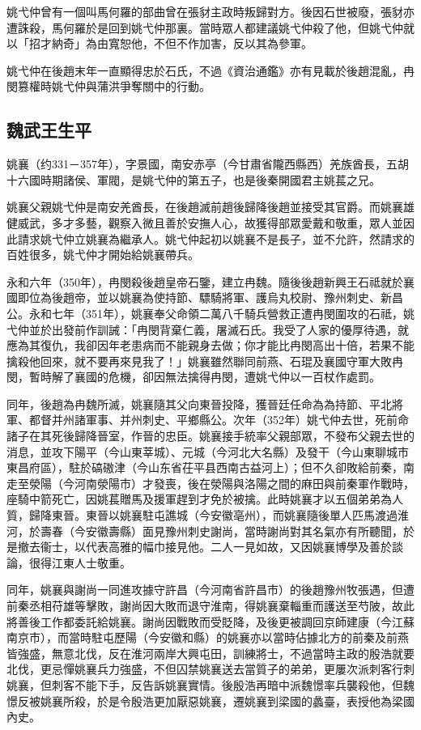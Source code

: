 姚弋仲曾有一個叫馬何羅的部曲曾在張豺主政時叛歸對方。後因石世被廢，張豺亦遭誅殺，馬何羅於是回到姚弋仲那裏。當時眾人都建議姚弋仲殺了他，但姚弋仲就以「招才納奇」為由寬恕他，不但不作加害，反以其為參軍。

姚弋仲在後趙末年一直顯得忠於石氏，不過《資治通鑑》亦有見載於後趙混亂，冉閔篡權時姚弋仲與蒲洪爭奪關中的行動。

\subsection{魏武王生平}

姚襄（约331－357年），字景國，南安赤亭（今甘肅省隴西縣西）羌族酋長，五胡十六國時期諸侯、軍閥，是姚弋仲的第五子，也是後秦開國君主姚萇之兄。

姚襄父親姚弋仲是南安羌酋長，在後趙滅前趙後歸降後趙並接受其官爵。而姚襄雄健威武，多才多藝，觀察入微且善於安撫人心，故獲得部眾愛戴和敬重，眾人並因此請求姚弋仲立姚襄為繼承人。姚弋仲起初以姚襄不是長子，並不允許，然請求的百姓很多，姚弋仲才開始給姚襄帶兵。

永和六年（350年），冉閔殺後趙皇帝石鑒，建立冉魏。隨後後趙新興王石祗就於襄國即位為後趙帝，並以姚襄為使持節、驃騎將軍、護烏丸校尉、豫州刺史、新昌公。永和七年（351年），姚襄奉父命領二萬八千騎兵營救正遭冉閔圍攻的石祗，姚弋仲並於出發前作訓誡：「冉閔背棄仁義，屠滅石氏。我受了人家的優厚待遇，就應為其復仇，我卻因年老患病而不能親身去做；你才能比冉閔高出十倍，若果不能擒殺他回來，就不要再來見我了！」姚襄雖然聯同前燕、石琨及襄國守軍大敗冉閔，暫時解了襄國的危機，卻因無法擒得冉閔，遭姚弋仲以一百杖作處罰。

同年，後趙為冉魏所滅，姚襄隨其父向東晉投降，獲晉廷任命為為持節、平北將軍、都督并州諸軍事、并州刺史、平鄉縣公。次年（352年）姚弋仲去世，死前命諸子在其死後歸降晉室，作晉的忠臣。姚襄接手統率父親部眾，不發布父親去世的消息，並攻下陽平（今山東莘城）、元城（今河北大名縣）及發干（今山東聊城市東昌府區），駐於碻磝津（今山东省茌平县西南古益河上）；但不久卻敗給前秦，南走至滎陽（今河南滎陽市）才發喪，後在滎陽與洛陽之間的麻田與前秦軍作戰時，座騎中箭死亡，因姚萇贈馬及援軍趕到才免於被擒。此時姚襄才以五個弟弟為人質，歸降東晉。東晉以姚襄駐屯譙城（今安徽亳州），而姚襄隨後單人匹馬渡過淮河，於壽春（今安徽壽縣）面見豫州刺史謝尚，當時謝尚對其名氣亦有所聽聞，於是撤去衞士，以代表高雅的幅巾接見他。二人一見如故，又因姚襄博學及善於談論，很得江東人士敬重。

同年，姚襄與謝尚一同進攻據守許昌（今河南省許昌市）的後趙豫州牧張遇，但遭前秦丞相苻雄等擊敗，謝尚因大敗而退守淮南，得姚襄棄輜重而護送至芍陂，故此將善後工作都委託給姚襄。謝尚因戰敗而受貶降，及後更被調回京師建康（今江蘇南京市），而當時駐屯歷陽（今安徽和縣）的姚襄亦以當時佔據北方的前秦及前燕皆強盛，無意北伐，反在淮河兩岸大興屯田，訓練將士，不過當時主政的殷浩就要北伐，更忌憚姚襄兵力強盛，不但囚禁姚襄送去當質子的弟弟，更屢次派刺客行刺姚襄，但刺客不能下手，反告訴姚襄實情。後殷浩再暗中派魏憬率兵襲殺他，但魏憬反被姚襄所殺，於是令殷浩更加厭惡姚襄，遷姚襄到梁國的蠡臺，表授他為梁國內史。

